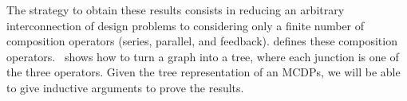 The strategy to obtain these results  consists in reducing an arbitrary interconnection of design problems to considering only a finite number of composition operators (series, parallel, and feedback).
 defines these composition operators.
~shows how to turn a graph into a tree, where each junction is one of the three operators.
Given the tree representation of an MCDPs, we will be able to give inductive arguments to prove the results.

